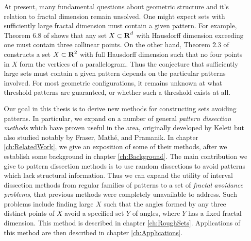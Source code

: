 At present, many fundamental questions about geometric structure and it's relation to fractal dimension remain unsolved. One might expect sets with sufficiently large fractal dimension must contain a given pattern. For example, Theorem 6.8 of \cite{Matilla} shows that any set $X \subset \operatorname{\mathbf{R}}^d$ with Hausdorff dimension exceeding one must contain three collinear points. On the other hand, Theorem 2.3 of \cite{Maga} constructs a set $X \subset \operatorname{\mathbf{R}}^2$ with full Hausdorff dimension such that no four points in $X$ form the vertices of a parallelogram. Thus the conjecture that sufficiently large sets must contain a given pattern depends on the particular patterns involved. For most geometric configurations, it remains unknown at what threshold patterns are guaranteed, or whether such a threshold exists at all.


Our goal in this thesis is to derive new methods for constructing sets avoiding patterns. In particular, we expand on a number of general {\it pattern dissection methods} which have proven useful in the area, originally developed by Keleti but also studied notably by Fraser, Math\'{e}, and Pramanik. In chapter \ref{ch:RelatedWork}, we give an exposition of some of their methods, after we establish some background in chapter \ref{ch:Background}. The main contribution we give to pattern dissection methods is to use random dissections to avoid patterns which lack structural information. Thus we can expand the utility of interval dissection methods from regular families of patterns to a set of {\it fractal avoidance problems}, that previous methods were completely unavailable to address. Such problems include finding large $X$ such that the angles formed by any three distinct points of $X$ avoid a specified set $Y$ of angles, where $Y$ has a fixed fractal dimension. This method is described in chapter \ref{ch:RoughSets}. Applications of this method are then described in chapter \ref{ch:Applications}.

\endinput

Any text after an \endinput is ignored.
You could put scraps here or things in progress.